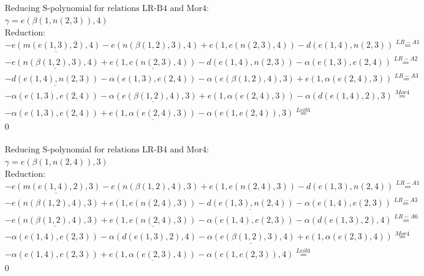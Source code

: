 \documentclass[11pt]{amsart}
\begin{document}
\begin{align*} 
& \text{Reducing S-polynomial for relations LR-B4 and Mor4:} \\ 
& \gamma = e(\beta(1,n(2,3)),4) \\ 
& \text{Reduction}: \\& - \underline{e(m(e(1,3),2),4)} - e(n(\beta(1,2),3),4) + e(1,e(n(2,3),4)) - d(e(1,4),n(2,3)) \stackrel{ LR-A1 }{=}  \\ 
& - \underline{e(n(\beta(1,2),3),4)} + \underline{e(1,e(n(2,3),4))} - d(e(1,4),n(2,3)) - \alpha(e(1,3),e(2,4)) \stackrel{ LR-A2 }{=}  \\ 
& - \underline{d(e(1,4),n(2,3))} - \alpha(e(1,3),e(2,4)) - \alpha(e(\beta(1,2),4),3) + e(1,\alpha(e(2,4),3)) \stackrel{ LR-A3 }{=}  \\ 
& - \alpha(e(1,3),e(2,4)) - \underline{\alpha(e(\beta(1,2),4),3)} + e(1,\alpha(e(2,4),3)) - \alpha(d(e(1,4),2),3) \stackrel{ Mor4 }{=}  \\ 
& - \alpha(e(1,3),e(2,4)) + \underline{e(1,\alpha(e(2,4),3))} - \alpha(e(1,e(2,4)),3) \stackrel{ Leib1 }{=}  \\ 
&0\\ 
\end{align*} 
 
\begin{align*} 
& \text{Reducing S-polynomial for relations LR-B4 and Mor4:} \\ 
& \gamma = e(\beta(1,n(2,4)),3) \\ 
& \text{Reduction}: \\& - \underline{e(m(e(1,4),2),3)} - e(n(\beta(1,2),4),3) + e(1,e(n(2,4),3)) - d(e(1,3),n(2,4)) \stackrel{ LR-A1 }{=}  \\ 
& - e(n(\beta(1,2),4),3) + e(1,e(n(2,4),3)) - \underline{d(e(1,3),n(2,4))} - \alpha(e(1,4),e(2,3)) \stackrel{ LR-A3 }{=}  \\ 
& - \underline{e(n(\beta(1,2),4),3)} + \underline{e(1,e(n(2,4),3))} - \alpha(e(1,4),e(2,3)) - \alpha(d(e(1,3),2),4) \stackrel{ LR-A6 }{=}  \\ 
& - \alpha(e(1,4),e(2,3)) - \alpha(d(e(1,3),2),4) - \underline{\alpha(e(\beta(1,2),3),4)} + e(1,\alpha(e(2,3),4)) \stackrel{ Mor4 }{=}  \\ 
& - \alpha(e(1,4),e(2,3)) + \underline{e(1,\alpha(e(2,3),4))} - \alpha(e(1,e(2,3)),4) \stackrel{ Leib1 }{=}  \\ 
&0\\ 
\end{align*} 
 
\end{document}
